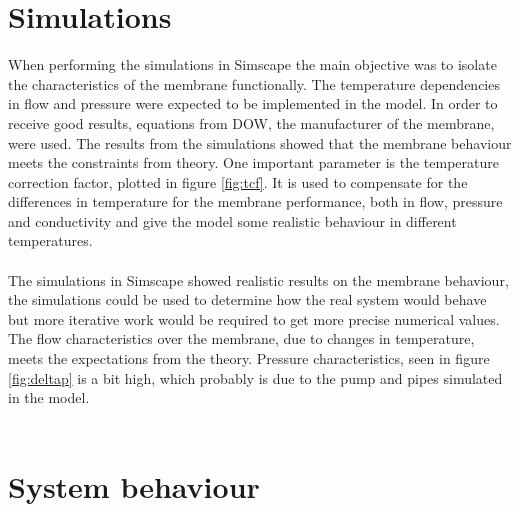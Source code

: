 \section{Simulations}
When performing the simulations in Simscape the main objective was to isolate the characteristics of the membrane functionally. The temperature dependencies in flow and pressure were expected to be implemented in the model. In order to receive good results, equations from DOW, the manufacturer of the membrane, were used. The results from the simulations showed that the membrane behaviour meets the constraints from theory. One important parameter is the temperature correction factor, plotted in figure \ref{fig:tcf}. It is used to compensate for the differences in temperature for the membrane performance, both in flow, pressure and conductivity and give the model some realistic behaviour in different temperatures. \\
\\
The simulations in Simscape showed realistic results on the membrane behaviour, the simulations could be used to determine how the real system would behave but more iterative work would be required to get more precise numerical values. The flow characteristics over the membrane, due to changes in temperature, meets the expectations from the theory. Pressure characteristics, seen in figure \ref{fig:deltap} is a bit high, which probably is due to the pump and pipes simulated in the model. \\
\\


\section{System behaviour} 


